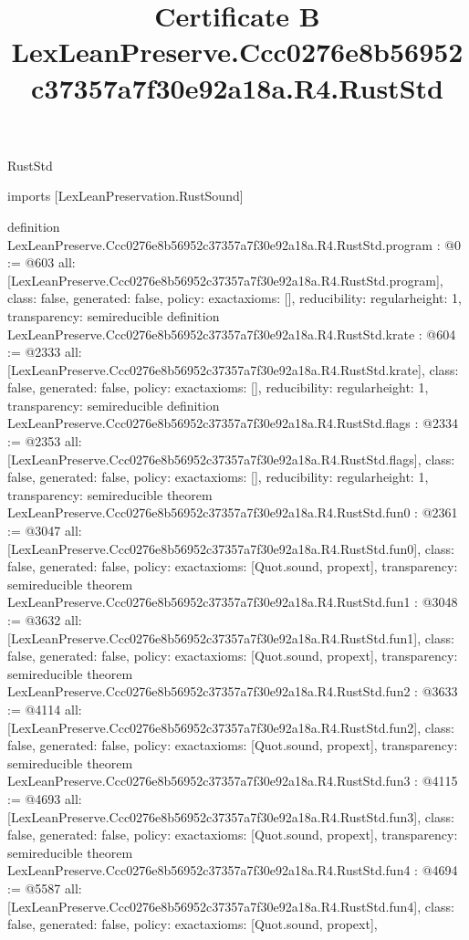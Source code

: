 \begin{lexlean}{RustStd}
\title{Certificate B LexLeanPreserve.Ccc0276e8b56952c37357a7f30e92a18a.R4.RustStd}
\begin{coremodule}
imports [LexLeanPreservation.RustSound]

definition LexLeanPreserve.Ccc0276e8b56952c37357a7f30e92a18a.R4.RustStd.program : @0 := @603 {
  all: [LexLeanPreserve.Ccc0276e8b56952c37357a7f30e92a18a.R4.RustStd.program],
  class: false,
  generated: false,
  policy: exact{axioms: []},
  reducibility: regular{height: 1},
  transparency: semireducible
}
definition LexLeanPreserve.Ccc0276e8b56952c37357a7f30e92a18a.R4.RustStd.krate : @604 := @2333 {
  all: [LexLeanPreserve.Ccc0276e8b56952c37357a7f30e92a18a.R4.RustStd.krate],
  class: false,
  generated: false,
  policy: exact{axioms: []},
  reducibility: regular{height: 1},
  transparency: semireducible
}
definition LexLeanPreserve.Ccc0276e8b56952c37357a7f30e92a18a.R4.RustStd.flags : @2334 := @2353 {
  all: [LexLeanPreserve.Ccc0276e8b56952c37357a7f30e92a18a.R4.RustStd.flags],
  class: false,
  generated: false,
  policy: exact{axioms: []},
  reducibility: regular{height: 1},
  transparency: semireducible
}
theorem LexLeanPreserve.Ccc0276e8b56952c37357a7f30e92a18a.R4.RustStd.fun0 : @2361 := @3047 {
  all: [LexLeanPreserve.Ccc0276e8b56952c37357a7f30e92a18a.R4.RustStd.fun0],
  class: false,
  generated: false,
  policy: exact{axioms: [Quot.sound, propext]},
  transparency: semireducible
}
theorem LexLeanPreserve.Ccc0276e8b56952c37357a7f30e92a18a.R4.RustStd.fun1 : @3048 := @3632 {
  all: [LexLeanPreserve.Ccc0276e8b56952c37357a7f30e92a18a.R4.RustStd.fun1],
  class: false,
  generated: false,
  policy: exact{axioms: [Quot.sound, propext]},
  transparency: semireducible
}
theorem LexLeanPreserve.Ccc0276e8b56952c37357a7f30e92a18a.R4.RustStd.fun2 : @3633 := @4114 {
  all: [LexLeanPreserve.Ccc0276e8b56952c37357a7f30e92a18a.R4.RustStd.fun2],
  class: false,
  generated: false,
  policy: exact{axioms: [Quot.sound, propext]},
  transparency: semireducible
}
theorem LexLeanPreserve.Ccc0276e8b56952c37357a7f30e92a18a.R4.RustStd.fun3 : @4115 := @4693 {
  all: [LexLeanPreserve.Ccc0276e8b56952c37357a7f30e92a18a.R4.RustStd.fun3],
  class: false,
  generated: false,
  policy: exact{axioms: [Quot.sound, propext]},
  transparency: semireducible
}
theorem LexLeanPreserve.Ccc0276e8b56952c37357a7f30e92a18a.R4.RustStd.fun4 : @4694 := @5587 {
  all: [LexLeanPreserve.Ccc0276e8b56952c37357a7f30e92a18a.R4.RustStd.fun4],
  class: false,
  generated: false,
  policy: exact{axioms: [Quot.sound, propext]},
}
\end{coremodule}
\end{lexlean}
